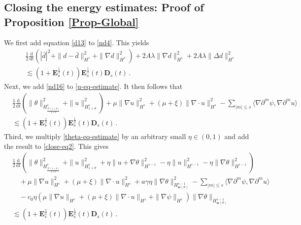 \documentclass[reqno,11pt]{amsart}
\numberwithin{equation}{section}
\def\d{\mathrm{d}}
\def\w{\mathfrak{w}}
\begin{document}
\subsection{Closing the energy estimates: Proof of Proposition \ref{Prop-Global}}

We first add equation \eqref{d13} to \eqref{nd4}. This yields
\begin{equation}\label{close-eq1}
\begin{aligned}
&\frac{1}{2} \frac{\d}{\d t} \left( |\bar{d}|^2 + \|d - \bar{d}\|_{H^s}^2 + \|\nabla d\|_{H^s}^2 \right) + 2A \lambda \|\nabla d\|_{H^s}^2 + 2A \lambda \|\Delta d\|_{H^s}^2 \\
& \lesssim ( 1 + \mathbf{E}_s^\frac{1}{2} (t) ) \mathbf{E}_s^\frac{1}{2} (t) \mathbf{D}_s (t) \,.
\end{aligned}
\end{equation}
Next, we add \eqref{nd16} to \eqref{u-eq-estimate}. It then follows that
\begin{equation}\label{close-eq2}
\begin{aligned}
&\frac{1}{2} \frac{\d}{\d t} \left( \| \theta\|_{H_{\frac{P^\prime(1+\theta)}{1+\theta}}^s}^2 + \|u\|_{H_{1+\theta}^s}^2 \right) + \mu \|\nabla u\|_{H^s}^2 + (\mu + \xi) \|\nabla \cdot u\|_{H^s}^2 - \sum_{|m| \leq s} \langle \nabla \partial^m \psi, \nabla \partial^m u \rangle \\&
\lesssim ( 1 + \mathbf{E}_s^\frac{s}{2} (t) ) \mathbf{E}_s^\frac{1}{2} (t) \mathbf{D}_s (t) \,.
\end{aligned}
\end{equation}
Third, we multiply \eqref{theta-eq-estimate} by an arbitrary small $\eta\in (0,1)$ and add the result to \eqref{close-eq2}. This gives
\begin{equation}\label{close-eq3}
\begin{aligned}
&\frac{1}{2} \frac{\d}{\d t} \left( \|\theta\|_{H_{\frac{P^\prime(1+\theta)}{1+\theta}}^s}^2+ \|u\|_{H_{1+\theta}^s}^2 + \eta \|u + \nabla \theta\|_{H^{s-1}}^2 - \eta \|u\|_{H^{s-1}}^2 - \eta \|\nabla \theta\|_{H^{s-1}}^2 \right) \\
& \quad+ \mu \|\nabla u\|_{H^s}^2 + (\mu + \xi) \|\nabla \cdot u\|_{H^s}^2 + a \gamma \eta \|\nabla \theta\|_{H_{\w (\theta)}^{s-1}}^2 - \sum_{|m| \leq s} \langle \nabla \partial^m \psi, \nabla \partial^m u \rangle \\
& \quad- c_0 \eta \left( \mu \|\nabla u\|_{H^s} + (\mu + \xi) \| \nabla \cdot u \|_{H^s} + \|\nabla \psi\|_{H^s} \right) \| \nabla \theta \|_{ H^{ s-1 }_{ \w (\theta) }} \\
& \lesssim ( 1 + \mathbf{E}_s^\frac{s}{2} (t) ) \mathbf{E}_s^\frac{1}{2} (t) \mathbf{D}_s (t)  \,.
\end{aligned}
\end{equation}
\end{document}
